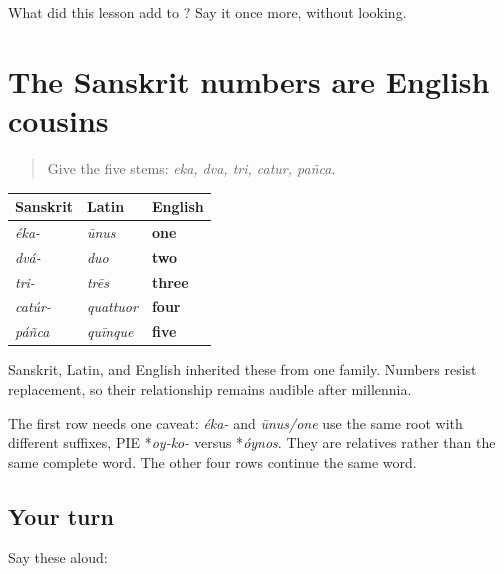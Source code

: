 \begin{tcolorbox}[breakable,colback=teal!4,colframe=teal!35!black,title={Before you move on}]
What did this lesson add to \textbf{    }? Say it once more, without looking.
\end{tcolorbox}
\section[\texorpdfstring{\sk{एक} · \sk{द्व} · \sk{त्रि} … (eka · dva · tri …)}{एक · द्व · त्रि … (eka · dva · tri …)}]{The Sanskrit numbers are English cousins}

\label{lesson:SA-C06-number-cognates}



\begin{quote}
Give the five stems: \emph{eka, dva, tri, catur, pañca}.
\end{quote}

\begin{grammarlens}[title={What you've built: one family, not borrowing}]
\noindent
\begin{tabularx}{\linewidth}{@{}>{\raggedright\arraybackslash}X>{\raggedright\arraybackslash}X>{\raggedright\arraybackslash}X@{}}
\toprule
\textbf{Sanskrit} & \textbf{Latin} & \textbf{English} \\
\midrule
\emph{éka-} & \emph{ūnus} & \textbf{one} \\
\emph{dvá-} & \emph{duo} & \textbf{two} \\
\emph{tri-} & \emph{trēs} & \textbf{three} \\
\emph{catúr-} & \emph{quattuor} & \textbf{four} \\
\emph{páñca} & \emph{quīnque} & \textbf{five} \\
\bottomrule
\end{tabularx}

Sanskrit, Latin, and English inherited these from one family. Numbers resist replacement, so their relationship remains audible after millennia.

The first row needs one caveat: \emph{éka-} and \emph{ūnus/one} use the same root with different suffixes, PIE *\emph{oy-ko-} versus *\emph{óynos}. They are relatives rather than the same complete word. The other four rows continue the same word.
\end{grammarlens}

\subsection*{Your turn}
Say these aloud:

